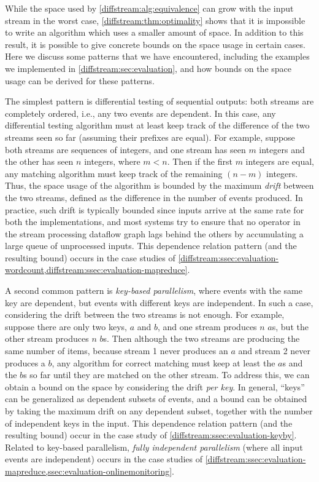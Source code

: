 While the space used by \cref{diffstream:alg:equivalence}  can grow with the input stream in the worst case, \cref{diffstream:thm:optimality} shows that it is impossible to write an algorithm which uses a smaller amount of space. In addition to this result, it is possible to give concrete bounds on the space usage in certain cases. Here we discuss some patterns that we have encountered, including the examples we implemented in \cref{diffstream:sec:evaluation}, and how bounds on the space usage can be derived for these patterns.

The simplest pattern is differential testing of sequential outputs: both streams are completely ordered, i.e., any two events are dependent. In this case, any differential testing algorithm must at least keep track of the difference of the two streams seen so far (assuming their prefixes are equal). For example, suppose both streams are sequences of integers, and one stream has seen $m$ integers and the other has seen $n$ integers, where $m < n$. Then if the first $m$ integers are equal, any matching algorithm must keep track of the remaining $(n - m)$ integers. Thus, the space usage of the algorithm is bounded by the maximum \emph{drift} between the two streams, defined as the difference in the number of events produced.
In practice, such drift is typically bounded since inputs arrive at the same rate for both the implementations, and
most systems try to ensure that no operator in the stream processing dataflow graph lags behind the others by accumulating a large queue of unprocessed inputs.
This dependence relation pattern (and the resulting bound) occurs in the case studies of \cref{diffstream:ssec:evaluation-wordcount,diffstream:ssec:evaluation-mapreduce}.

A second common pattern is \emph{key-based parallelism}, where events with the same key are dependent, but events with different keys are independent. In such a case, considering the drift between the two streams is not enough. For example, suppose there are only two keys, $a$ and $b$, and one stream produces $n$ $a$s, but the other stream produces $n$ $b$s. Then although the two streams are producing the same number of items, because stream 1 never produces an $a$ and stream 2 never produces a $b$, any algorithm for correct matching must keep at least the $a$s and the $b$s so far until they are matched on the other stream. To address this, we can obtain a bound on the space by considering the drift \emph{per key}. In general, ``keys'' can be generalized as dependent subsets of events, and a bound can be obtained by taking the maximum drift on any dependent subset, together with the number of independent keys in the input. This dependence relation pattern (and the resulting bound) occur in the case study of \cref{diffstream:ssec:evaluation-keyby}.
Related to key-based parallelism, \emph{fully independent parallelism} (where all input events are independent) occurs in the case studies of \cref{diffstream:ssec:evaluation-mapreduce,ssec:evaluation-onlinemonitoring}.

